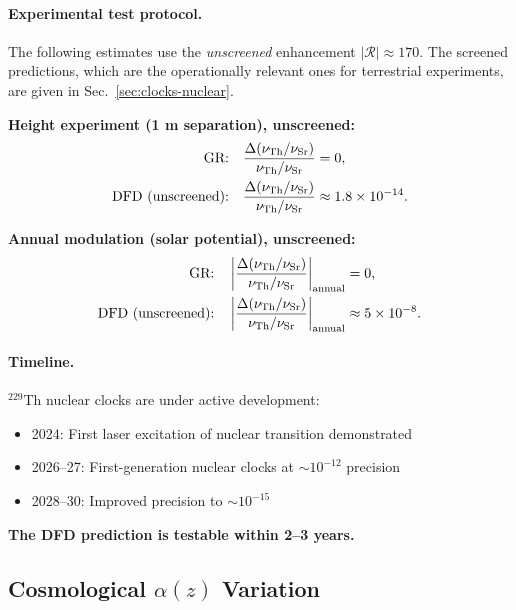 \paragraph{Experimental test protocol.}
The following estimates use the \emph{unscreened} enhancement $|\mathcal{R}| \approx 170$.  The screened predictions, which are the operationally relevant ones for terrestrial experiments, are given in Sec.~\ref{sec:clocks-nuclear}.

\textbf{Height experiment (1 m separation), unscreened:}
\begin{align}
\text{GR:}& \quad \frac{\Delta(\nu_{\rm Th}/\nu_{\rm Sr})}{\nu_{\rm Th}/\nu_{\rm Sr}} = 0, \\
\text{DFD (unscreened):}& \quad \frac{\Delta(\nu_{\rm Th}/\nu_{\rm Sr})}{\nu_{\rm Th}/\nu_{\rm Sr}} \approx 1.8 \times 10^{-14}.
\end{align}

\textbf{Annual modulation (solar potential), unscreened:}
\begin{align}
\text{GR:}& \quad \left|\frac{\Delta(\nu_{\rm Th}/\nu_{\rm Sr})}{\nu_{\rm Th}/\nu_{\rm Sr}}\right|_{\rm annual} = 0, \\
\text{DFD (unscreened):}& \quad \left|\frac{\Delta(\nu_{\rm Th}/\nu_{\rm Sr})}{\nu_{\rm Th}/\nu_{\rm Sr}}\right|_{\rm annual} \approx 5 \times 10^{-8}.
\end{align}

\paragraph{Timeline.}
$^{229}$Th nuclear clocks are under active development:
\begin{itemize}
\item 2024: First laser excitation of nuclear transition demonstrated
\item 2026--27: First-generation nuclear clocks at $\sim 10^{-12}$ precision
\item 2028--30: Improved precision to $\sim 10^{-15}$
\end{itemize}

\textbf{The DFD prediction is testable within 2--3 years.}

\subsection{Cosmological $\alpha(z)$ Variation}\label{sec:gauge-cosmology}

